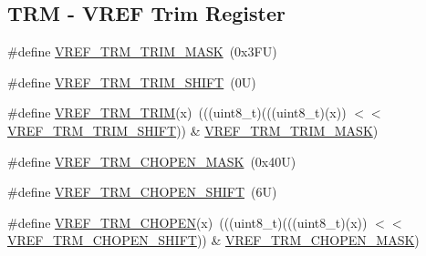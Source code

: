 \subsection*{T\+RM -\/ V\+R\+EF Trim Register}
\begin{DoxyCompactItemize}
\item 
\#define \mbox{\hyperlink{group___v_r_e_f___register___masks_gaf233ddf56401003ec721b808d3910978}{V\+R\+E\+F\+\_\+\+T\+R\+M\+\_\+\+T\+R\+I\+M\+\_\+\+M\+A\+SK}}~(0x3\+F\+U)
\item 
\#define \mbox{\hyperlink{group___v_r_e_f___register___masks_ga7738b4edb18c8c9dcb36d6be564c80e6}{V\+R\+E\+F\+\_\+\+T\+R\+M\+\_\+\+T\+R\+I\+M\+\_\+\+S\+H\+I\+FT}}~(0\+U)
\item 
\#define \mbox{\hyperlink{group___v_r_e_f___register___masks_ga7b200f282af693ea614c6bb380a5bfb8}{V\+R\+E\+F\+\_\+\+T\+R\+M\+\_\+\+T\+R\+IM}}(x)~(((uint8\+\_\+t)(((uint8\+\_\+t)(x)) $<$$<$ \mbox{\hyperlink{group___v_r_e_f___register___masks_ga7738b4edb18c8c9dcb36d6be564c80e6}{V\+R\+E\+F\+\_\+\+T\+R\+M\+\_\+\+T\+R\+I\+M\+\_\+\+S\+H\+I\+FT}})) \& \mbox{\hyperlink{group___v_r_e_f___register___masks_gaf233ddf56401003ec721b808d3910978}{V\+R\+E\+F\+\_\+\+T\+R\+M\+\_\+\+T\+R\+I\+M\+\_\+\+M\+A\+SK}})
\item 
\#define \mbox{\hyperlink{group___v_r_e_f___register___masks_gaca90564d0247d6637d487fa045dbe328}{V\+R\+E\+F\+\_\+\+T\+R\+M\+\_\+\+C\+H\+O\+P\+E\+N\+\_\+\+M\+A\+SK}}~(0x40\+U)
\item 
\#define \mbox{\hyperlink{group___v_r_e_f___register___masks_gad66c35e7a2372a16a0ef1042ad0d029a}{V\+R\+E\+F\+\_\+\+T\+R\+M\+\_\+\+C\+H\+O\+P\+E\+N\+\_\+\+S\+H\+I\+FT}}~(6\+U)
\item 
\#define \mbox{\hyperlink{group___v_r_e_f___register___masks_gaaa2d50a050e401275bb8db441075a60c}{V\+R\+E\+F\+\_\+\+T\+R\+M\+\_\+\+C\+H\+O\+P\+EN}}(x)~(((uint8\+\_\+t)(((uint8\+\_\+t)(x)) $<$$<$ \mbox{\hyperlink{group___v_r_e_f___register___masks_gad66c35e7a2372a16a0ef1042ad0d029a}{V\+R\+E\+F\+\_\+\+T\+R\+M\+\_\+\+C\+H\+O\+P\+E\+N\+\_\+\+S\+H\+I\+FT}})) \& \mbox{\hyperlink{group___v_r_e_f___register___masks_gaca90564d0247d6637d487fa045dbe328}{V\+R\+E\+F\+\_\+\+T\+R\+M\+\_\+\+C\+H\+O\+P\+E\+N\+\_\+\+M\+A\+SK}})
\end{DoxyCompactItemize}
